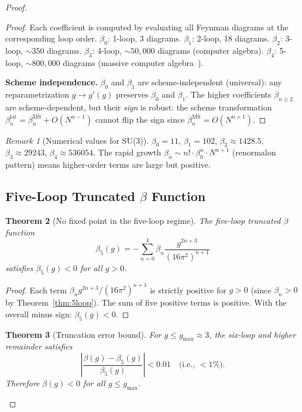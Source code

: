 \documentclass[12pt,a4paper]{article}
\theoremstyle{plain}
\newtheorem{theorem}{Theorem}[section]
\theoremstyle{definition}
\theoremstyle{remark}
\newtheorem{remark}[theorem]{Remark}
\begin{document}
\begin{proof}
\begin{proof}
Each coefficient is computed by evaluating all Feynman diagrams at the corresponding loop order. $\beta_0$: 1-loop, 3 diagrams. $\beta_1$: 2-loop, 18 diagrams. $\beta_2$: 3-loop, $\sim 350$ diagrams. $\beta_3$: 4-loop, $\sim 50{,}000$ diagrams (computer algebra). $\beta_4$: 5-loop, $\sim 800{,}000$ diagrams (massive computer algebra~\cite{Czakon2005}).

\textbf{Scheme independence.} $\beta_0$ and $\beta_1$ are scheme-independent (universal): any reparametrization $g\to g'(g)$ preserves $\beta_0$ and $\beta_1$. The higher coefficients $\beta_{n\geq 2}$ are scheme-dependent, but their \emph{sign} is robust: the scheme transformation $\beta_n^{\mathrm{lat}}=\beta_n^{\overline{\mathrm{MS}}}+O(N^{n-1})$ cannot flip the sign since $\beta_n^{\overline{\mathrm{MS}}}=O(N^{n+1})$.
\end{proof}

\begin{remark}[Numerical values for SU(3)]
$\beta_0=11$, $\beta_1=102$, $\beta_2\approx 1428.5$, $\beta_3\approx 29243$, $\beta_4\approx 536054$. The rapid growth $\beta_n\sim n!\cdot\beta_0^n\cdot N^{n+1}$ (renormalon pattern) means higher-order terms are large but positive.
\end{remark}

\subsection{Five-Loop Truncated $\beta$ Function}\label{sec:trunc}

\begin{theorem}[No fixed point in the five-loop regime]\label{thm:noFP}
The five-loop truncated $\beta$ function
\begin{equation}\label{eq:beta5}
\beta_5(g) = -\sum_{n=0}^{4}\beta_n\frac{g^{2n+3}}{(16\pi^2)^{n+1}}
\end{equation}
satisfies $\beta_5(g)<0$ for all $g>0$.
\end{theorem}

\begin{proof}
Each term $\beta_n g^{2n+3}/(16\pi^2)^{n+1}$ is strictly positive for $g>0$ (since $\beta_n>0$ by Theorem~\ref{thm:5loop}). The sum of five positive terms is positive. With the overall minus sign: $\beta_5(g)<0$.
\end{proof}

\begin{theorem}[Truncation error bound]\label{thm:trunc}
For $g\leq g_{\max}\approx 3$, the six-loop and higher remainder satisfies
\begin{equation}\label{eq:remainder}
\left|\frac{\beta(g)-\beta_5(g)}{\beta_5(g)}\right| < 0.01 \quad\text{(i.e., $<1\%$)}.
\end{equation}
Therefore $\beta(g)<0$ for all $g\leq g_{\max}$.
\end{theorem}


\end{proof}
\end{document}
